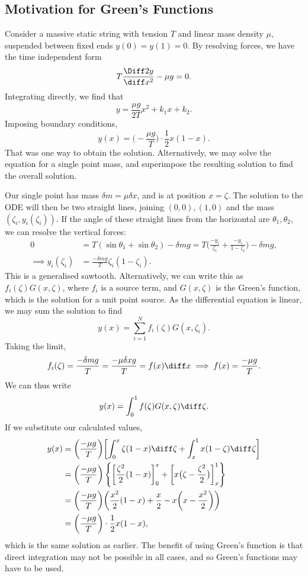 \documentclass[12pt]{article}
\begin{document}
\subsection{Motivation for Green's Functions}%
\label{sub:motivation_for_green_s_functions}

Consider a massive static string with tension $T$ and linear mass density $\mu$, suspended between fixed ends $y(0) = y(1) = 0$. By resolving forces, we have the time independent form
\[
T \frac{\Diff 2 y}{\diff x^2} - \mu g = 0
.\]
Integrating directly, we find that
\[
y = \frac{\mu g}{2T}x^2 + k_1x + k_2
.\]
Imposing boundary conditions,
\[
	y(x) = \biggl( - \frac{\mu g}{T} \biggr) \cdot \frac{1}{2} x(1 - x)
.\]
That was one way to obtain the solution. Alternatively, we may solve the equation for a single point mass, and superimpose the resulting solution to find the overall solution.

Our single point has mass $\delta m = \mu \delta x$, and is at position $x = \zeta$. The solution to the ODE will then be two straight lines, joining $(0, 0), (1, 0)$ and the mass $(\zeta_i, y_i(\zeta_i))$. If the angle of these straight lines from the horizontal are $\theta_1, \theta_2$, we can resolve the vertical forces:
\begin{align*}
	0 &= T(\sin \theta_1 + \sin \theta_2) - \delta mg = T \biggl( \frac{-y_i}{\zeta_i} + \frac{-y_i}{1 - \zeta_i} \biggr) - \delta mg, \\
	\implies y_i(\zeta_i) &= \frac{- \delta mg}{T} \zeta_i(1 - \zeta_i).
\end{align*}
This is a generalised sawtooth. Alternatively, we can write this as $f_i(\zeta)G(x, \zeta)$, where $f_i$ is a source term, and $G(x, \zeta)$ is the Green's function, which is the solution for a unit point source. As the differential equation is linear, we may sum the solution to find
\[
	y(x) = \sum_{i = 1}^{N} f_i(\zeta)G(x, \zeta_i)
.\]
Taking the limit,
\[
	f_i(\zeta) = \frac{-\delta mg}{T} = \frac{- \mu \delta x g}{T} = f(x) \diff x \implies f(x) = \frac{- \mu g}{T}
.\]
We can thus write
\[
	y(x) = \int_{0}^{1}f(\zeta)G(x, \zeta) \diff \zeta
.\]
If we substitute our calculated values,
\begin{align*}
	y(x) &= \biggl( \frac{- \mu g}{T} \biggr) \biggl[ \int_{0}^{x} \zeta(1 - x)\diff \zeta + \int_{x}^{1}x(1 - \zeta)\diff \zeta \biggr] \\
	     &= \biggl( \frac{- \mu g}{T} \biggr) \left\{ \left[\frac{\zeta^2}{2}(1 - x)\right]_{0}^{x} + \left[x\bigl(\zeta - \frac{\zeta^2}{2} \bigr) \right]_{x}^{1} \right\} \\
	     &= \biggl( \frac{- \mu g}{T} \biggr) \biggl( \frac{x^2}{2} (1 - x) + \frac{x}{2} - x \biggl( x - \frac{x^2}{2} \biggr) \biggr) \\
	     &= \biggl( \frac{-\mu g}{T} \biggr) \cdot \frac{1}{2} x(1 - x),
\end{align*}
which is the same solution as earlier. The benefit of using Green's function is that direct integration may not be possible in all cases, and so Green's functions may have to be used.
\end{document}
